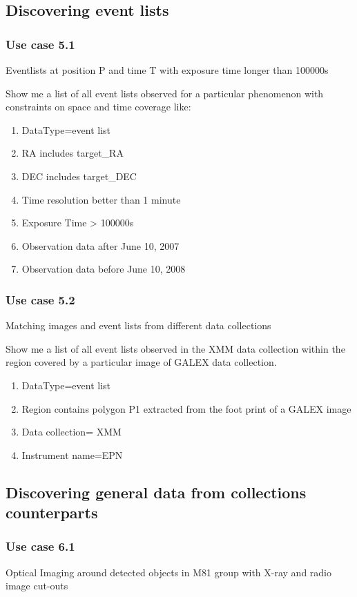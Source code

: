 \documentclass[11pt,a4paper]{ivoa}
\begin{document}
\subsection{Discovering event lists}
\subsubsection{Use case 5.1}
Eventlists at position P and time T with exposure time longer than 100000s

Show me a list of all event lists observed for a particular phenomenon with constraints on space and time coverage like:

\begin{enumerate}
\item DataType=event list
\item RA includes target\_RA
\item DEC includes target\_DEC
\item Time resolution better than 1 minute
\item Exposure Time {\textgreater} 100000s
\item Observation data after June 10, 2007
\item Observation data before June 10, 2008
\end{enumerate}

\subsubsection{Use case 5.2}
Matching images and event lists from different data collections

Show me a list of all event lists observed in the XMM data collection within the region covered by a particular image of
GALEX data collection.

\begin{enumerate}
\item DataType=event list
\item Region contains polygon P1 extracted from the foot print of a GALEX image
\item Data collection= XMM
\item Instrument name=EPN
\end{enumerate}

\subsection[Discovering general data from collections counterparts]{Discovering general data from collections
counterparts}
\subsubsection{Use case 6.1}
Optical Imaging around detected objects in M81 group with X-ray and radio image cut-outs
\end{document}
